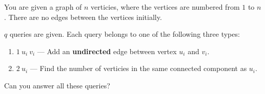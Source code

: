 You are given a graph of $n$ verticies, where the vertices are numbered from $1$ to $n$.
There are no edges between the vertices initially.

$q$ queries are given. Each query belongs to one of the following three types:
\begin{enumerate}
    \item $1\ u_i\ v_i$ — Add an \textbf{undirected} edge between vertex $u_i$ and $v_i$.
    \item $2\ u_i$ — Find the number of verticies in the same connected component as $u_i$.
\end{enumerate}
Can you answer all these queries?